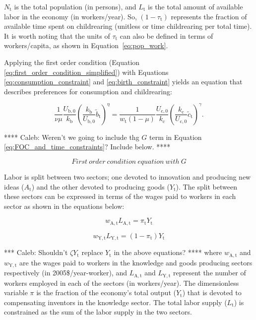 \documentclass[letterpaper,12pt]{article}
\begin{document}
\noindent $N_\mathrm{t}$ is the total population (in persons), and $L_\mathrm{t}$ is the total amount of available labor in the economy (in workers/year). So, $(1-\tau_\mathrm{t})$ represents the fraction of available time spent on childrearing (unitless or time childrearing per total time). It is worth noting that the units of $\tau_\mathrm{t}$ can also be defined in terms of workers/capita, as shown in Equation~\ref{eq:pop_work}.

Applying the first order condition (Equation \ref{eq:first_order_condition_simplified}) with Equations \ref{eq:consumption_constraint} and \ref{eq:birth_constraint} yields an equation that describes preferences for consumption and childrearing:

\begin{equation} \label{eq:FOC_and_time_constraints}
	\frac{1}{\nu \mu} \frac{U_\mathrm{b,0}}{k_\mathrm{b}} \left( \frac{k_\mathrm{b}}{U_\mathrm{b,0}} \tilde b_\mathrm{t} \right) ^{\eta} 
	= \frac{1}{w_\mathrm{t}(1-\mu)} \frac{U_\mathrm{c,0}}{k_\mathrm{c}}  \left( \frac{k_\mathrm{c}}{U_\mathrm{c,0}} \tilde c_\mathrm{t} \right)^\gamma .
\end{equation}

**** Caleb: Weren't we going to include thg $G$ term in Equation \ref{eq:FOC_and_time_constraints}? Include below. ****

\begin{equation} \label{eq:FOC_with_G}
  First~order~condition~equation~with~G
\end{equation}

Labor is split between two sectors; one devoted to innovation and producing new ideas ($A_\mathrm{t}$) and the other devoted to producing goods ($Y_\mathrm{t}$). The split between these sectors can be expressed in terms of the wages paid to workers in each sector as shown in the equations below:

\begin{equation} \label{eq:knowledge_comp}
	w_\mathrm{A,t} L_\mathrm{A,t} = \pi_\mathrm{t} Y_\mathrm{t}
\end{equation}

\begin{equation} \label{eq:labor_comp}
	w_\mathrm{Y,t} L_\mathrm{Y,t} = (1-\pi_\mathrm{t}) Y_\mathrm{t}
\end{equation}

\noindent **** Caleb: Shouldn't $\zeta Y_\mathrm{t}$ replace $Y_\mathrm{t}$ in the above equations? **** where $w_\mathrm{A,t}$ and $w_\mathrm{Y,t}$ are the wages paid to workers in the knowledge and goods producing sectors respectively (in 2005\$/year-worker), and $L_\mathrm{A,t}$ and $L_\mathrm{Y,t}$ represent the number of workers employed in each of the sectors (in workers/year). The dimensionless variable $\pi$ is the fraction of the economy's total output ($Y_\mathrm{t}$) that is devoted to compensating inventors in the knowledge sector. The total labor supply ($L_\mathrm{t}$) is constrained as the sum of the labor supply in the two sectors.
\end{document}
